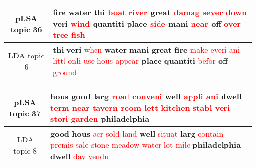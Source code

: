 \begin{center}\begin{tabularx}{\textwidth} {
  | c | >{\raggedright\arraybackslash}X | } \hline 
pLSA topic 36 & \textbf{fire} \textbf{water} \textbf{thi} \textcolor{red}{boat} \textcolor{red}{river} \textbf{great} \textcolor{red}{damag} \textcolor{red}{sever} \textcolor{red}{down} \textbf{veri} \textcolor{red}{wind} \textbf{quantiti} \textbf{place} \textcolor{red}{side} \textbf{mani} \textcolor{red}{near} \textbf{off} \textcolor{red}{over} \textcolor{red}{tree} \textcolor{red}{fish} \\ \hline 
LDA topic 6 & \textbf{thi} \textbf{veri} \textcolor{red}{when} \textbf{water} \textbf{mani} \textbf{great} \textbf{fire} \textcolor{red}{make} \textcolor{red}{everi} \textcolor{red}{ani} \textcolor{red}{littl} \textcolor{red}{onli} \textcolor{red}{use} \textcolor{red}{hous} \textcolor{red}{appear} \textbf{place} \textbf{quantiti} \textcolor{red}{befor} \textbf{off} \textcolor{red}{ground} \\ \hline 
\end{tabularx}

\end{center}

\begin{center}\begin{tabularx}{\textwidth} {
  | c | >{\raggedright\arraybackslash}X | } \hline 
pLSA topic 37 & \textbf{hous} \textbf{good} \textbf{larg} \textcolor{red}{road} \textcolor{red}{conveni} \textbf{well} \textcolor{red}{appli} \textcolor{red}{ani} \textbf{dwell} \textcolor{red}{term} \textcolor{red}{near} \textcolor{red}{tavern} \textcolor{red}{room} \textcolor{red}{lett} \textcolor{red}{kitchen} \textcolor{red}{stabl} \textcolor{red}{veri} \textcolor{red}{stori} \textcolor{red}{garden} \textbf{philadelphia} \\ \hline 
LDA topic 8 & \textbf{good} \textbf{hous} \textcolor{red}{acr} \textcolor{red}{sold} \textcolor{red}{land} \textbf{well} \textcolor{red}{situat} \textbf{larg} \textcolor{red}{contain} \textcolor{red}{premis} \textcolor{red}{sale} \textcolor{red}{stone} \textcolor{red}{meadow} \textcolor{red}{water} \textcolor{red}{lot} \textcolor{red}{mile} \textbf{philadelphia} \textbf{dwell} \textcolor{red}{day} \textcolor{red}{vendu} \\ \hline 
\end{tabularx}

\end{center}

